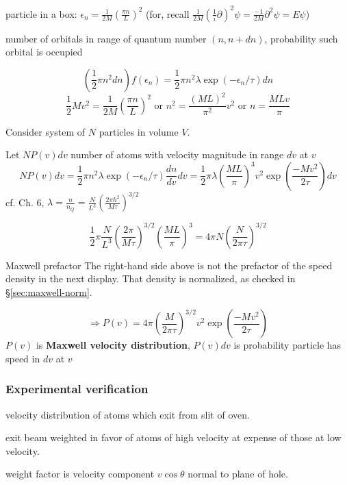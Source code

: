 particle in a box: $\epsilon_n = \frac{1}{2M} \left( \frac{\pi n}{L} \right)^2 $ (for, recall $\frac{1}{2M} \left( \frac{1}{i} \partial \right)^2 \psi = \frac{-1}{2M} \partial^2 \psi = E \psi$)

number of orbitals in range of quantum number $(n,n+dn)$, probability such orbital is occupied

\[
(\frac{1}{2} \pi n^2 dn)f(\epsilon_n) = \frac{1}{2} \pi n^2 \lambda \exp{ (-\epsilon_n/\tau) } dn
\]
\[
\frac{1}{2} Mv^2 = \frac{1}{2M} \left( \frac{ \pi n}{ L } \right)^2 \text{ or } n^2 = \frac{ (ML)^2 }{ \pi^2} v^2 \text{ or } n = \frac{MLv}{\pi}
\]

Consider system of $N$ particles in volume $V$.  

Let $NP(v) dv$ number of atoms with velocity magnitude in range $dv$ at $v$
\[
NP(v) dv = \frac{1}{2} \pi n^2 \lambda \exp{ ( -\epsilon_n /\tau)} \frac{dn}{dv} dv = \frac{1}{2} \pi \lambda \left( \frac{ ML }{ \pi } \right)^3 v^2 \exp{ \left( \frac{ -Mv^2 }{2\tau } \right) }dv
\]
cf. Ch. 6, $\lambda = \frac{n}{n_Q} = \frac{N}{L^3} \left( \frac{ 2\pi \hbar^2 }{ M \tau } \right)^{3/2}$

\[
\frac{1}{2} \pi \frac{N}{L^3} \left( \frac{2\pi }{ M \tau} \right)^{3/2} \left( \frac{ ML }{\pi } \right)^3 = 4\pi N \left( \frac{N}{2\pi \tau} \right)^{3/2}
\]
\begin{correction}{Maxwell prefactor}
The right-hand side above is not the prefactor of the speed density in the next display.
That density is normalized, as checked in \S\ref{sec:maxwell-norm}.
\end{correction}
\begin{equation}
\Longrightarrow P(v) = 4\pi \left( \frac{M}{2\pi \tau } \right)^{3/2} v^2 \exp{ \left( \frac{- Mv^2}{ 2\tau } \right) } 
\end{equation}
$P(v)$ is \textbf{Maxwell velocity distribution}, $P(v)dv$ is probability particle has speed in $dv$ at $v$

\subsubsection*{Experimental verification}

velocity distribution of atoms which exit from slit of oven.  

exit beam weighted in favor of atoms of high velocity at expense of those at low velocity. 

weight factor is velocity component $v\cos{\theta}$ normal to plane of hole. 

